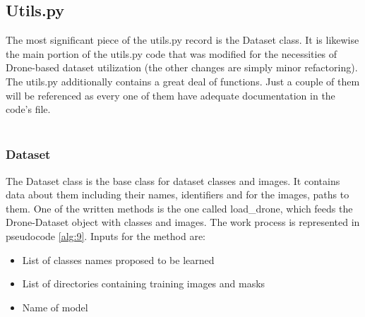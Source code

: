 \subsection{Utils.py} \label{sec:utils}
The most significant piece of the utils.py record is the Dataset class. It is likewise the main portion of the utils.py code that was modified for the necessities of Drone-based dataset utilization (the other changes are simply minor refactoring). The utils.py additionally contains a great deal of functions. Just a couple of them will be referenced as every one of them have adequate documentation in the code's file.
\\
\\
\subsubsection{Dataset}

The Dataset class is the base class for dataset classes and images. It contains data about them including their names, identifiers and for the images, paths to them. One of the written methods is the one called load\_drone, which feeds the Drone-Dataset object with classes and images. The work process is represented in pseudocode \ref{alg:9}. Inputs for the method are: 
\begin{itemize}
  \item List of classes names proposed to be learned

  \item List of directories containing training images and masks 
  \item Name of model
\end{itemize}

